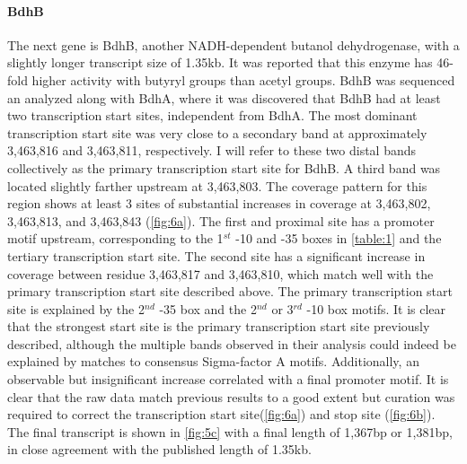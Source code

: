 \paragraph{BdhB}
The next gene is BdhB, another NADH-dependent butanol dehydrogenase, with a slightly longer transcript size of 1.35kb. It was reported that this enzyme has 46-fold higher activity with butyryl groups than acetyl groups\cite{71,73}. BdhB was sequenced an analyzed along with BdhA, where it was discovered that BdhB had at least two transcription start sites, independent from BdhA. The most dominant transcription start site was very close to a secondary band at approximately 3,463,816 and 3,463,811, respectively\cite{73}. I will refer to these two distal bands collectively as the primary transcription start site for BdhB. A third band was located slightly farther upstream at 3,463,803\cite{73}. The coverage pattern for this region shows at least 3 sites of substantial increases in coverage at 3,463,802, 3,463,813, and 3,463,843 (\ref{fig:6a}). The first and proximal site has a promoter motif upstream, corresponding to the 1$^{st}$ -10 and -35 boxes in \ref{table:1} and the tertiary transcription start site\cite{72}. The second site has a significant increase in coverage between residue 3,463,817 and 3,463,810, which match well with the primary transcription start site described above\cite{73}. The primary transcription start site is explained by the 2$^{nd}$  -35 box and the 2$^{nd}$ or 3$^{rd}$ -10 box motifs\cite{73}. It is clear that the strongest start site is the primary transcription start site previously described\cite{73}, although the multiple bands observed in their analysis could indeed be explained by matches to consensus Sigma-factor A motifs. Additionally, an observable but insignificant increase correlated with a final promoter motif. It is clear that the raw data match previous results to a good extent but curation was required to correct the transcription start site(\ref{fig:6a}) and stop site (\ref{fig:6b}). The final transcript is shown in \ref{fig:5c} with a final length of 1,367bp or 1,381bp, in close agreement with the published length of 1.35kb.

